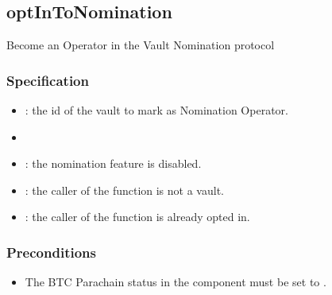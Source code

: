 \documentclass[a4paper,10pt,english]{sphinxmanual}
\begin{document}
\subsection{optInToNomination}
\label{\detokenize{spec/nomination:optintonomination}}\label{\detokenize{spec/nomination:id6}}
Become an Operator in the Vault Nomination protocol


\subsubsection{Specification}
\label{\detokenize{spec/nomination:id7}}


\begin{itemize}
\item {} 
: the id of the vault to mark as Nomination Operator.

\end{itemize}

\begin{itemize}
\item {} 

\end{itemize}

\begin{itemize}
\item {} 
: the nomination feature is disabled.

\item {} 
: the caller of the function is not a vault.

\item {} 
: the caller of the function is already opted in.

\end{itemize}


\subsubsection{Preconditions}
\label{\detokenize{spec/nomination:preconditions}}\begin{itemize}
\item {} 
The BTC Parachain status in the {\hyperref[\detokenize{spec/security:security}]{}} component must be set to .

\end{itemize}
\end{document}

